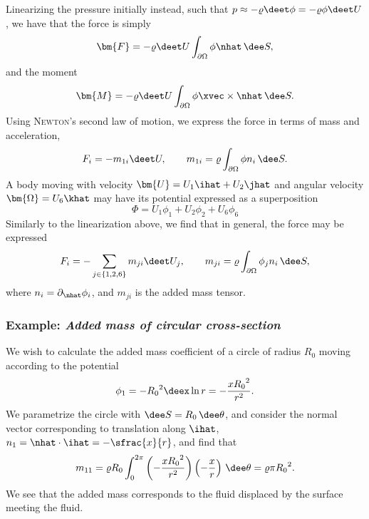 Linearizing the pressure initially instead, such that $p \approx -\varrho \deet\phi = -\varrho\phi\deet U$, we have that the force is simply
\[
    \bm{F} = -\varrho \deet U \int_{\partial\Omega} \phi\nhat \,\dee S,
\]
and the moment
\[
    \bm{M} = -\varrho \deet U \int_{\partial\Omega} \phi \xvec\times\nhat \,\dee S.
\]
Using \textsc{Newton}'s second law of motion, we express the force in terms of mass and acceleration,
\[
    F_i = -m_{1i} \deet U, \qquad m_{1i} = \varrho\int_{\partial\Omega} \phi n_i \,\dee S.
\]
A body moving with velocity $\bm{U} = U_1 \ihat + U_2 \jhat$ and angular velocity $\bm{\Omega} = U_6 \khat$ may have its potential expressed as a superposition
\[
    \Phi = U_1 \phi_1 + U_2 \phi_2 + U_6 \phi_6
\]
Similarly to the linearization above, we find that in general, the force may be expressed
\[
    F_i = -\sum_{j \in \{1,2,6\}} m_{ji} \deet U_j, \qquad m_{ji} = \varrho \int_{\partial\Omega} \phi_j n_i \,\dee S,
\]
where $n_i = \partial_{\nhat} \phi_i$, and $m_{ji}$ is the added mass tensor.

\subsubsection*{Example: \emph{Added mass of circular cross-section}}
We wish to calculate the added mass coefficient of a circle of radius $R_0$ moving according to the potential
\[
    \phi_1 = -{R_0}^2 \deex\ln{r} = -\frac{x{R_0}^2}{r^2}.
\]
We parametrize the circle with $\dee S = R_0 \,\dee\theta$, and consider the normal vector corresponding to translation along $\ihat$, $n_1 = \nhat\cdot\ihat = -\sfrac{x}{r}$, and find that
\[
    m_{11} = \varrho R_0 \int_{0}^{2\pi} \left( -\frac{x {R_0}^2}{r^2} \right) \left( -\frac{x}{r} \right) \,\dee\theta = \varrho \pi {R_0}^2.
\]
We see that the added mass corresponds to the fluid displaced by the surface meeting the fluid.
